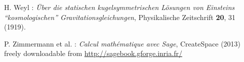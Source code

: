 \begin{thebibliography}{123}
H. Weyl : {\em \"Uber die statischen kugelsymmetrischen L\"osungen von Einsteins ``kosmologischen'' Gravitationsgleichungen},
Physikalische Zeitschrift {\bf 20}, 31 (1919).

P. Zimmermann et al. : {\em Calcul math\'ematique avec Sage}, CreateSpace (2013) \\
freely downloadable from \url{http://sagebook.gforge.inria.fr/}

\end{thebibliography}
